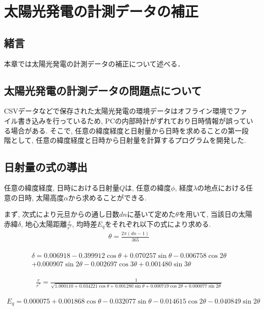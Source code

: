 
\chapter{太陽光発電の計測データの補正}
\label{chap:second}

\section{緒言}
本章では太陽光発電の計測データの補正について述べる．


\section{太陽光発電の計測データの問題点について}
CSVデータなどで保存された太陽光発電の環境データはオフライン環境でファイル書き込みを行っているため, PCの内部時計がずれており日時情報が誤っている場合がある.
そこで, 任意の緯度経度と日射量から日時を求めることの第一段階として, 任意の緯度経度と日時から日射量を計算するプログラムを開発した.

\section{日射量の式の導出}
任意の緯度経度, 日時における日射量$Q$は, 任意の緯度$\phi$, 経度$\lambda$の地点における任意の日時, 太陽高度$\alpha$から求めることができる.

まず, 次式により元旦からの通し日数$dn$に基いて定めた$\theta$を用いて, 当該日の太陽赤緯$\delta$, 地心太陽距離$\frac{r}{r^{*}}$, 均時差$E_q$をそれぞれ以下の式により求める.
\begin{eqnarray}
  \theta =  \frac{2\pi (dn-1)}{365}
\end{eqnarray}

\begin{eqnarray}
\begin{split}
  \delta =  0.006918-0.399912\cos \theta+0.070257\sin \theta-0.006758\cos 2\theta\\
  +0.000907\sin 2\theta-0.002697\cos 3\theta+0.001480\sin 3\theta
\end{split}
\end{eqnarray}

\begin{eqnarray}
  \frac{r}{r^{*}} =  \frac{1}{\sqrt{1.000110+0.034221\cos \theta+0.001280\sin \theta+0.000719\cos 2\theta+0.000077\sin 2\theta}}
\end{eqnarray}

\begin{eqnarray}
  E_q =  0.000075+0.001868\cos \theta-0.032077\sin \theta-0.014615\cos 2\theta-0.040849\sin 2\theta
\end{eqnarray}

